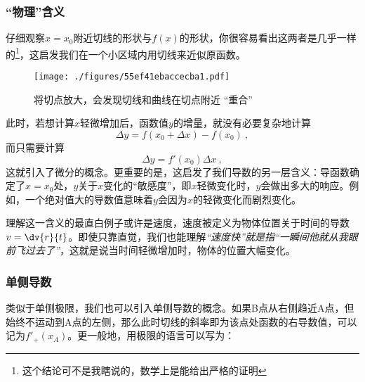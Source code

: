\subsubsection{“物理”含义}
仔细观察$x=x_0$附近切线的形状与$f(x)$的形状，你很容易看出这两者是几乎一样的\footnote{这个结论可不是我瞎说的，数学上是能给出严格的证明}，这启发我们在一个小区域内用切线来近似原函数。

\begin{figure}[ht]
\centering
\texttt{[image: ./figures/55ef41ebaccecba1.pdf]}
\caption{将切点放大，会发现切线和曲线在切点附近 “重合”}\label{fig_Der_1}
\end{figure}

此时，若想计算$x$轻微增加后，函数值$y$的增量，就没有必要复杂地计算
$$\Delta y = f(x_0+\Delta x) - f(x_0)~,$$
而只需要计算
\begin{equation}
\Delta y = f'(x_0) \Delta x~,
\end{equation}
这就引入了微分的概念。更重要的是，这启发了我们导数的另一层含义：导函数确定了$x=x_0$处，$y$关于$x$变化的“敏感度”，即$x$轻微变化时，$y$会做出多大的响应。例如，一个绝对值大的导数值意味着$y$会因为$x$的轻微变化而剧烈变化。

理解这一含义的最直白例子或许是速度，速度被定义为物体位置关于时间的导数$v=\dv{r}{t}$。即使只靠直觉，我们也能理解\textsl{“速度快”就是指“一瞬间他就从我眼前飞过去了”}，这就是说当时间轻微增加时，物体的位置大幅变化。


\subsubsection{单侧导数}
类似于单侧极限，我们也可以引入单侧导数的概念。如果B点从右侧趋近A点，但始终不运动到A点的左侧，那么此时切线的斜率即为该点处函数的右导数值，可以记为$f'_+(x_A)$。更一般地，用极限的语言可以写为：

